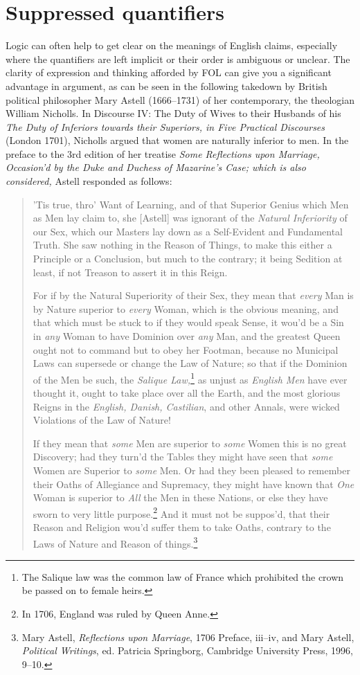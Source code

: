 \section{Suppressed quantifiers}

Logic can often help to get clear on the meanings of English claims,
especially where the quantifiers are left implicit or their order is
ambiguous or unclear. The clarity of expression and thinking afforded
by FOL can give you a significant advantage in argument, as can be
seen in the following takedown by British political philosopher Mary
Astell (1666--1731) of her contemporary, the theologian William
Nicholls. In Discourse IV: The Duty of Wives to their Husbands of his
\textit{The Duty of Inferiors towards their Superiors, in Five
  Practical Discourses} (London 1701), Nicholls argued that women are
naturally inferior to men. In the preface to the 3rd edition of her
treatise \emph{Some Reflections upon Marriage, Occasion'd by the Duke
  and Duchess of Mazarine's Case; which is also considered,} Astell
responded as follows:
\begin{quotation}
'Tis true, thro' Want of Learning, and of that Superior Genius which
Men as Men lay claim to, she [Astell] was ignorant of the
\textit{Natural Inferiority} of our Sex, which our Masters lay down as
a Self-Evident and Fundamental Truth. She saw nothing in the Reason of
Things, to make this either a Principle or a Conclusion, but much to
the contrary; it being Sedition at least, if not Treason to assert it
in this Reign.

For if by the Natural Superiority of their Sex, they mean that
\textit{every} Man is by Nature superior to \textit{every} Woman,
which is the obvious meaning, and that which must be stuck to if they
would speak Sense, it wou'd be a Sin in \textit{any} Woman to have
Dominion over \textit{any} Man, and the greatest Queen ought not to
command but to obey her Footman, because no Municipal Laws can
supersede or change the Law of Nature; so that if the Dominion of the
Men be such, the \textit{Salique Law,}\footnote{The Salique law was
  the common law of France which prohibited the crown be passed on to
  female heirs.} as unjust as \textit{English Men} have ever thought
it, ought to take place over all the Earth, and the most glorious
Reigns in the \textit{English, Danish, Castilian}, and other Annals,
were wicked Violations of the Law of Nature!

If they mean that \textit{some} Men are superior to \textit{some}
Women this is no great Discovery; had they turn'd the Tables they
might have seen that \textit{some} Women are Superior to \textit{some}
Men. Or had they been pleased to remember their Oaths of Allegiance
and Supremacy, they might have known that \textit{One} Woman is
superior to \textit{All} the Men in these Nations, or else they have
sworn to very little purpose.\footnote{In 1706, England was ruled by
  Queen Anne.} And it must not be suppos'd, that their Reason and
Religion wou'd suffer them to take Oaths, contrary to the Laws of
Nature and Reason of things.\footnote{Mary Astell, \textit{Reflections
    upon Marriage}, 1706 Preface, iii--iv, and Mary Astell,
  \textit{Political Writings}, ed. Patricia Springborg, Cambridge
  University Press, 1996, 9--10.}
\end{quotation}
